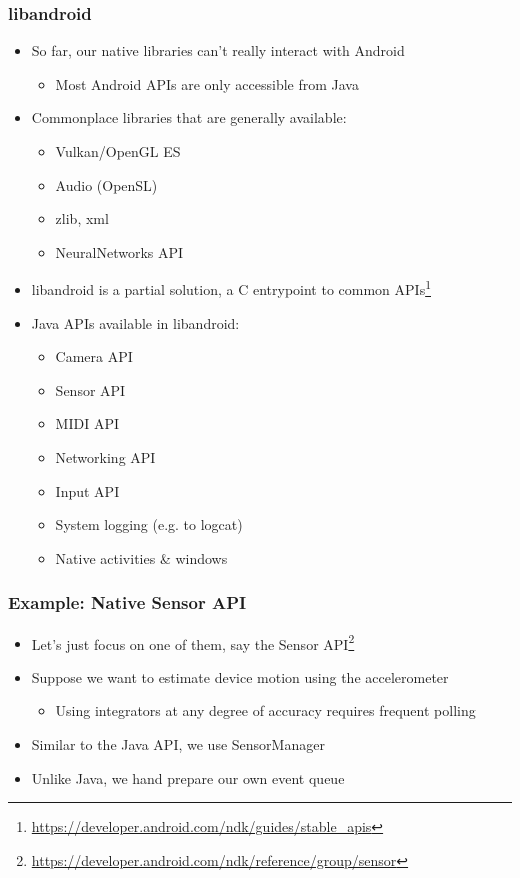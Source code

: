 \documentclass[10pt,mathserif]{beamer}
\begin{document}
	\begin{frame}
		\frametitle{libandroid}

		\begin{itemize}
			\item So far, our native libraries can't really interact with Android
			\begin{itemize}
				\item Most Android APIs are only accessible from Java
			\end{itemize}
			\item Commonplace libraries that are generally available:
			\begin{itemize}
				\item Vulkan/OpenGL ES
				\item Audio (OpenSL)
				\item zlib, xml
				\item NeuralNetworks API
			\end{itemize}
			\item libandroid is a partial solution, a C entrypoint to common APIs\footnote{\href{https://developer.android.com/ndk/guides/stable\_apis}{https://developer.android.com/ndk/guides/stable\_apis}}
			\item Java APIs available in libandroid:
			\begin{itemize}
				\item Camera API
				\item Sensor API
				\item MIDI API
				\item Networking API
				\item Input API
				\item System logging (e.g. to logcat)
				\item Native activities \& windows
			\end{itemize}
		\end{itemize}
	\end{frame}

	\begin{frame}
		\frametitle{Example: Native Sensor API}

		\begin{itemize}
			\item Let's just focus on one of them, say the Sensor API\footnote{\href{https://developer.android.com/ndk/reference/group/sensor}{https://developer.android.com/ndk/reference/group/sensor}}
			\item Suppose we want to estimate device motion using the accelerometer
			\begin{itemize}
				\item Using integrators at any degree of accuracy requires frequent polling
			\end{itemize}
			\item Similar to the Java API, we use SensorManager
			\item Unlike Java, we hand prepare our own event queue
		\end{itemize}

	\end{frame}
\end{document}
